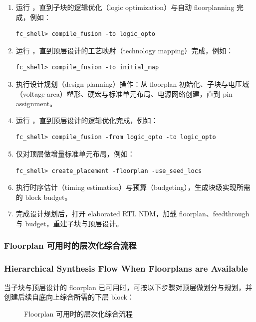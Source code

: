 \begin{enumerate}
  \item 运行 ，直到子块的逻辑优化（logic optimization）与自动 floorplanning 完成，例如：
\begin{lstlisting}
fc_shell> compile_fusion -to logic_opto
\end{lstlisting}

  \item 运行 ，直到顶层设计的工艺映射（technology mapping）完成，例如：
\begin{lstlisting}
fc_shell> compile_fusion -to initial_map
\end{lstlisting}

  \item 执行设计规划（design planning）操作：从 floorplan 初始化、子块与电压域（voltage area）塑形、硬宏与标准单元布局、电源网络创建，直到 pin assignment。

  \item 运行 ，直到顶层设计的逻辑优化完成，例如：
\begin{lstlisting}
fc_shell> compile_fusion -from logic_opto -to logic_opto
\end{lstlisting}

  \item 仅对顶层做增量标准单元布局，例如：
\begin{lstlisting}
fc_shell> create_placement -floorplan -use_seed_locs
\end{lstlisting}

  \item 执行时序估计（timing estimation）与预算（budgeting），生成块级实现所需的 block budget。

  \item 完成设计规划后，打开 elaborated RTL NDM，加载 floorplan、feedthrough 与 budget，重建子块与顶层设计。
\end{enumerate}

\subsubsection{Floorplan 可用时的层次化综合流程}
\subsubsection*{Hierarchical Synthesis Flow When Floorplans are Available}

当子块与顶层设计的 floorplan 已可用时，可按以下步骤对顶层做划分与规划，并创建后续自底向上综合所需的下层 block：

\begin{figure}[htbp]
\centering
{}
\caption{Floorplan 可用时的层次化综合流程}
\label{fig:hier-synth-with-fp}
\end{figure}

